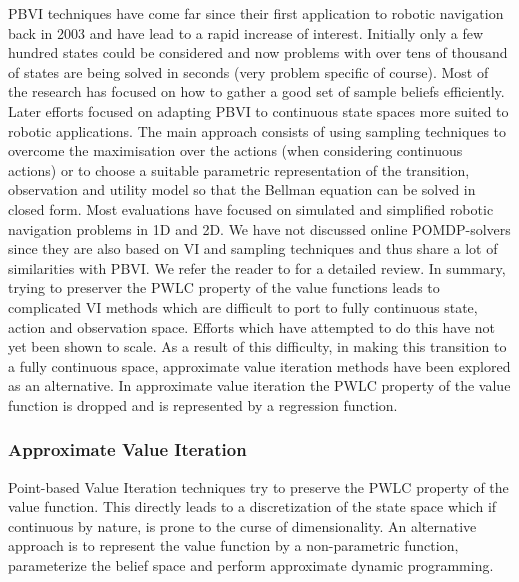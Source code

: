 PBVI techniques have come far since their first application to robotic navigation back in 2003 and have lead to a rapid increase of interest. 
Initially only a few hundred states could be considered and now problems with over tens of thousand of states are being solved in seconds (very problem specific of course). 
Most of the research has focused on how to gather a good set of sample beliefs efficiently. Later efforts focused on adapting PBVI 
to continuous state spaces more suited to robotic applications. The main approach consists of using sampling techniques to overcome 
the maximisation over the actions (when considering continuous actions) or to choose a suitable parametric representation of the transition, observation 
and utility model so that the Bellman equation can be solved in closed form. Most evaluations have focused on simulated and simplified robotic 
navigation problems in 1D and 2D. We have not discussed online POMDP-solvers since they are also based on VI and sampling techniques and thus share 
a lot of similarities with PBVI. We refer the reader to \cite{Ross08onlineplanning} for a detailed review. In summary, trying to preserver the PWLC property 
of the value functions leads to complicated VI methods which are difficult to port to fully continuous state, action and observation space. Efforts which 
have attempted to do this have not yet been shown to scale. As a result of this difficulty, in making this transition to a fully continuous space, approximate value 
iteration methods have been explored as an alternative. In approximate value iteration the PWLC property of the value function is dropped and is 
represented by a regression function.


\subsubsection{Approximate Value Iteration}

Point-based Value Iteration techniques try to preserve the PWLC property of the value function. This directly 
leads to a discretization of the state space which if continuous by nature, is prone to the curse of dimensionality.
An alternative approach is to represent the value function by a non-parametric function, parameterize the belief space and perform approximate 
dynamic programming.  


